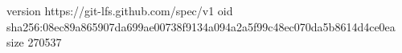version https://git-lfs.github.com/spec/v1
oid sha256:08ec89a865907da699ae00738f9134a094a2a5f99c48ec070da5b8614d4ce0ea
size 270537
